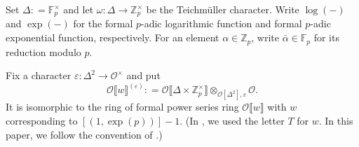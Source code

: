 \documentclass[12pt]{amsart}
\theoremstyle{definition}
\numberwithin{equation}{subsection}
\def\calO{\mathcal{O}}
\def\FF{\mathbb{F}}
\def\ZZ{\mathbb{Z}}
\begin{document}
Set $\Delta : = \FF_p^\times$
and let $\omega: \Delta \to \ZZ_p^\times$ be the Teichm\"uller character. 
Write $\log(-)$ and $\exp(-)$ for the formal $p$-adic logarithmic function and formal $p$-adic exponential function, respectively. For an element $\alpha \in \ZZ_p$, write $\bar \alpha \in \FF_p$ for its reduction modulo $p$.

Fix a character $\varepsilon: \Delta^2 \to \calO^\times$ and put
\[
\calO\llbracket w \rrbracket^{(\varepsilon)}: = \calO\llbracket \Delta \times \ZZ_p^\times\rrbracket \otimes_{\calO[\Delta^2], \varepsilon} \calO. 
\]
It is isomorphic to the ring of formal power series ring $\calO\llbracket w \rrbracket$ with $w$ corresponding to $[(1, \exp(p))]-1$. (In \cite{liu-wan-xiao}, we used the letter $T$ for $w$. In this paper, we follow the convention of \cite{bergdall-pollack2, bergdall-pollack3}.)
\end{document}
